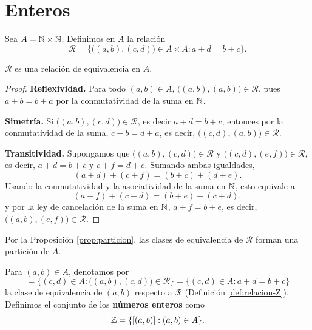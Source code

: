 \documentclass[12pt,a4paper]{book}
\begin{document}
    \section{Enteros}

    \begin{definicion}
        \label{def:relacion-Z}
        Sea $A=\mathbb{N}\times\mathbb{N}$. Definimos en $A$ la relación
        \begin{equation*}
            \mathcal{R} = \big\{\big((a,b),(c,d)\big)\in A\times A : a+d=b+c\big\}.
        \end{equation*}
    \end{definicion}

    \begin{proposicion}
        \label{prop:R-equivalencia}
        $\mathcal{R}$ es una relación de equivalencia en $A$.
    \end{proposicion}
    \begin{proof}
        \textbf{Reflexividad.} Para todo $(a,b)\in A$, $\big((a,b),(a,b)\big)\in\mathcal{R}$, pues $a+b=b+a$ por la conmutatividad de la suma en $\mathbb{N}$.

        \textbf{Simetría.} Si $\big((a,b),(c,d)\big)\in\mathcal{R}$, es decir $a+d=b+c$, entonces por la conmutatividad de la suma, $c+b=d+a$, es decir, $\big((c,d),(a,b)\big)\in\mathcal{R}$.

        \textbf{Transitividad.} Supongamos que $\big((a,b),(c,d)\big)\in\mathcal{R}$ y $\big((c,d),(e,f)\big)\in\mathcal{R}$, es decir, $a+d=b+c$ y $c+f=d+e$. Sumando ambas igualdades,
        \begin{equation*}
            (a+d)+(c+f) = (b+c)+(d+e).
        \end{equation*}
        Usando la conmutatividad y la asociatividad de la suma en $\mathbb{N}$, esto equivale a
        \begin{equation*}
            (a+f)+(c+d) = (b+e)+(c+d),
        \end{equation*}
        y por la ley de cancelación de la suma en $\mathbb{N}$, $a+f=b+e$, es decir, $\big((a,b),(e,f)\big)\in\mathcal{R}$.
    \end{proof}

    Por la Proposición \ref{prop:particion}, las clases de equivalencia de $\mathcal{R}$ forman una partición de $A$.

    \begin{definicion}
        \label{def:enteros}
        Para $(a,b)\in A$, denotamos por
        \begin{equation*}
            [(a,b)] = \{(c,d)\in A : \big((a,b),(c,d)\big)\in\mathcal{R}\} = \{(c,d)\in A : a+d=b+c\}
        \end{equation*}
        la clase de equivalencia de $(a,b)$ respecto a $\mathcal{R}$ (Definición \ref{def:relacion-Z}). Definimos el conjunto de los \textbf{números enteros} como
        \begin{equation*}
            \mathbb{Z} = \{[(a,b)] : (a,b)\in A\}.
        \end{equation*}
    \end{definicion}
\end{document}
